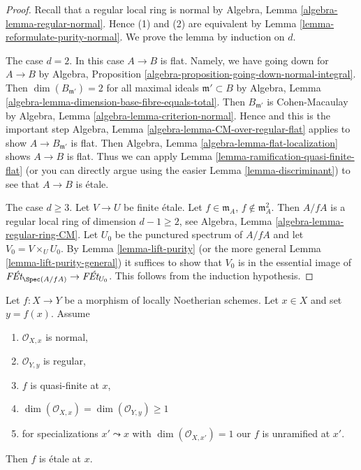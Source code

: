 \begin{proof}
Recall that a regular local ring is normal by
Algebra, Lemma \ref{algebra-lemma-regular-normal}.
Hence (1) and (2) are equivalent by
Lemma \ref{lemma-reformulate-purity-normal}.
We prove the lemma by induction on $d$.

\medskip\noindent
The case $d = 2$. In this case $A \to B$ is flat.
Namely, we have going down for $A \to B$ by
Algebra, Proposition \ref{algebra-proposition-going-down-normal-integral}.
Then $\dim(B_{\mathfrak m'}) = 2$ for all maximal ideals
$\mathfrak m' \subset B$ by
Algebra, Lemma \ref{algebra-lemma-dimension-base-fibre-equals-total}.
Then $B_{\mathfrak m'}$ is Cohen-Macaulay by
Algebra, Lemma \ref{algebra-lemma-criterion-normal}.
Hence and this is the important step
Algebra, Lemma \ref{algebra-lemma-CM-over-regular-flat}
applies to show $A \to B_{\mathfrak m'}$ is flat.
Then Algebra, Lemma \ref{algebra-lemma-flat-localization}
shows $A \to B$ is flat. Thus we can apply
Lemma \ref{lemma-ramification-quasi-finite-flat}
(or you can directly argue using the easier Lemma \ref{lemma-discriminant})
to see that $A \to B$ is \'etale.

\medskip\noindent
The case $d \geq 3$. Let $V \to U$ be finite \'etale.
Let $f \in \mathfrak m_A$, $f \not \in \mathfrak m_A^2$.
Then $A/fA$ is a regular local ring of dimension $d - 1 \geq 2$, see
Algebra, Lemma \ref{algebra-lemma-regular-ring-CM}.
Let $U_0$ be the punctured spectrum of $A/fA$ and let
$V_0 = V \times_U U_0$.
By Lemma \ref{lemma-lift-purity} (or the more general
Lemma \ref{lemma-lift-purity-general})
it suffices to show that $V_0$ is in the essential
image of $\textit{F\'Et}_{\Spec(A/fA)} \to \textit{F\'Et}_{U_0}$.
This follows from the induction hypothesis.
\end{proof}

\begin{lemma}
\label{lemma-purity}
Let $f : X \to Y$ be a morphism of locally Noetherian schemes.
Let $x \in X$ and set $y = f(x)$. Assume
\begin{enumerate}
\item $\mathcal{O}_{X, x}$ is normal,
\item $\mathcal{O}_{Y, y}$ is regular,
\item $f$ is quasi-finite at $x$,
\item $\dim(\mathcal{O}_{X, x}) = \dim(\mathcal{O}_{Y, y}) \geq 1$
\item for specializations $x' \leadsto x$ with
$\dim(\mathcal{O}_{X, x'}) = 1$ our $f$ is unramified at $x'$.
\end{enumerate}
Then $f$ is \'etale at $x$.
\end{lemma}

